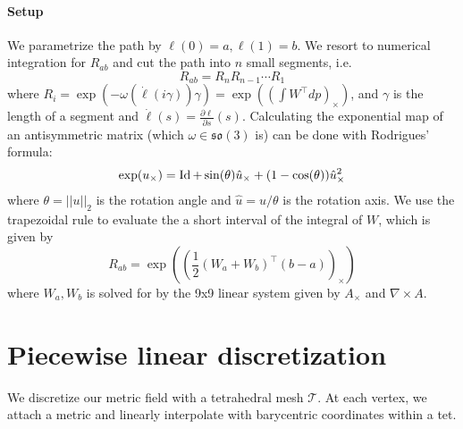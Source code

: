 \documentclass[../thesis.tex]{subfiles}
\begin{document}
\paragraph{Setup}
We parametrize the path by $\ell(0)=a, \ell(1)=b$.
We resort to numerical integration for $R_{ab}$ and cut the path into $n$ small segments, i.e.
$$R_{ab}= R_nR_{n-1} \dotsb R_1$$
where $R_i = \exp(-\omega (\dot{\ell}(i\gamma))\gamma) = \exp((\int W^{\top}dp)_{\times})$, and $\gamma$ is the length of a segment and $\dot{\ell}(s)=\frac{\partial \ell}{\partial s}(s)$.
Calculating the exponential map of an antisymmetric matrix (which $\omega \in \mathfrak{so}(3)$ is) can be done with Rodrigues' formula:
$$\exp(u_{\times}) = \operatorname{Id} + \sin(\theta) \hat{u}_{\times} + (1-\cos(\theta)) \hat{u}_{\times}^2$$
where $\theta = ||u||_2$ is the rotation angle and $\hat{u}= u/\theta$ is the rotation axis.
We use the trapezoidal rule to evaluate the a short interval of the integral of $W$, which is given by
$$R_{ab}=\exp \left( \left(\frac{1}{2}(W_a + W_b)^{\top}(b-a)\right)_{\times}\right)$$
where $W_a, W_b$ is solved for by the 9x9 linear system given by $A_{\times}$ and $\nabla \times A$.


\section{Piecewise linear discretization}
We discretize our metric field with a tetrahedral mesh $\mathcal{T}$.
At each vertex, we attach a metric and linearly interpolate with barycentric coordinates within a tet.
\end{document}
